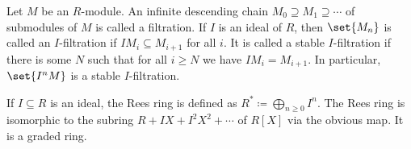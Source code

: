 Let $M$ be an $R$-module. An infinite descending chain $M_0\supseteq M_1\supseteq \cdots$
of submodules of $M$ is called a filtration. If $I$ is an ideal of $R$, then
$\set{M_n}$ is called an $I$-filtration if $IM_i \subseteq M_{i+1}$ for all $i$.
It is called a stable $I$-filtration if there is some $N$ such that for all $i\geq N$
we have $IM_i = M_{i+1}$. In particular, $\set{I^nM}$ is a stable $I$-filtration.

If $I \subseteq R$ is an ideal, the Rees ring is defined as $R^*\coloneqq \bigoplus_{n\geq 0} I^n$.
The Rees ring is isomorphic to the subring $R + IX + I^2X^2 + \cdots$ of
$R[X]$ via the obvious map. It is a graded ring.
